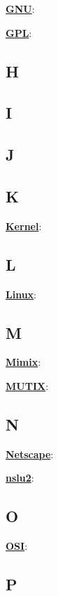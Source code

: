 \underline{\textbf{GNU}}: %

\underline{\textbf{GPL}}: %

\subsection*{H}

\subsection*{I}

\subsection*{J}

\subsection*{K}

\underline{\textbf{Kernel}}: %

\subsection*{L}

\underline{\textbf{Linux}}: %

\subsection*{M}

\underline{\textbf{Mimix}}: %

\underline{\textbf{MUTIX}}: %

\subsection*{N}

\underline{\textbf{Netscape}}: %

\underline{\textbf{nslu2}}: %

\subsection*{O}

\underline{\textbf{OSI}}: %

\subsection*{P}

